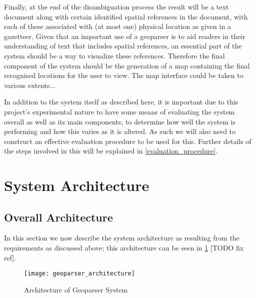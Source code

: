 \documentclass[12pt, a4paper]{report}
\begin{document}
Finally, at the end of the disambiguation process the result will be a text document along with certain identified spatial references in the document, with each of these associated with (at most one) physical location as given in a gazetteer. Given that an important use of a geoparser is to aid readers in their understanding of text that includes spatial references, an essential part of the system should be a way to visualize these references. Therefore the final component of the system should be the generation of a map containing the final recognised locations for the user to view. The map interface could be taken to various extents...
 
In addition to the system itself as described here, it is important due to this project's experimental nature to have some means of evaluating the system overall as well as its main components, to determine how well the system is performing and how this varies as it is altered. As such we will also need to construct an effective evaluation procedure to be used for this. Further details of the steps involved in this will be explained in \ref{evaluation_procedure}. 

\section{System Architecture}


\subsection{Overall Architecture}
\label{overall_architecture}


In this section we now describe the system architecture as resulting from the requirements as discussed above; this architecture can be seen in \ref{fig:geoparser_architecture} [TODO fix ref].

\begin{figure}[h!]
  \centering
  \texttt{[image: geoparser\_architecture]}
  \label{fig:geoparser_architecture}
  \caption{Architecture of Geoparser System}
\end{figure}
\end{document}

